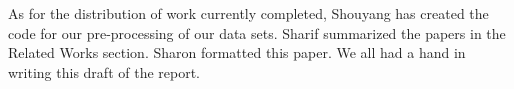 \documentclass[11pt,a4paper]{article}
\begin{document}
As for the distribution of work currently completed, Shouyang has created the code for our pre-processing of our data sets. Sharif summarized the papers in the Related Works section. Sharon formatted this paper. We all had a hand in writing this draft of the report. 

%
%


\end{document}
